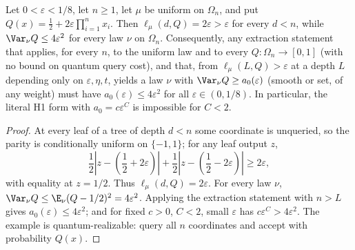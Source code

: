 \begin{proposition}
\label{ian:hard-sector-dispersion-order}
Let \(0<\varepsilon<1/8\), let \(n\ge1\), let \(\mu\) be uniform on
\(\Omega_n\), and put \(Q(x)=\frac12+2\varepsilon\prod_{i=1}^nx_i\).
Then \(\ell_\mu(d,Q)=2\varepsilon>\varepsilon\) for every \(d<n\), while
\(\Var_\nu Q\le4\varepsilon^2\) for every law \(\nu\) on \(\Omega_n\).
Consequently, any extraction statement that applies, for every \(n\),
to the uniform law and to every \(Q:\Omega_n\to[0,1]\) (with no bound
on quantum query cost), and that, from
\(\ell_\mu(L,Q)>\varepsilon\) at a depth \(L\) depending only on
\(\varepsilon,\eta,t\), yields a law \(\nu\) with
\(\Var_\nu Q\ge a_0(\varepsilon)\) (smooth or set, of any weight) must
have \(a_0(\varepsilon)\le4\varepsilon^2\) for all
\(\varepsilon\in(0,1/8)\). In particular, the literal H1 form
with \(a_0=c\varepsilon^C\) is impossible for \(C<2\).
\end{proposition}

\begin{proof}
At every leaf of a tree of depth \(d<n\) some coordinate is unqueried,
so the parity is conditionally uniform on \(\{-1,1\}\); for any leaf
output \(z\),
\[
 \frac12\left|z-\left(\frac12+2\varepsilon\right)\right|
 +\frac12\left|z-\left(\frac12-2\varepsilon\right)\right|
 \ge2\varepsilon,
\]
with equality at \(z=1/2\). Thus \(\ell_\mu(d,Q)=2\varepsilon\). For every
law \(\nu\), \(\Var_\nu Q\le\E_\nu(Q-1/2)^2=4\varepsilon^2\). Applying
the extraction statement with \(n>L\) gives
\(a_0(\varepsilon)\le4\varepsilon^2\); and for fixed \(c>0\), \(C<2\),
small \(\varepsilon\) has \(c\varepsilon^C>4\varepsilon^2\).
The example is quantum-realizable: query all \(n\) coordinates and
accept with probability \(Q(x)\).
\end{proof}

